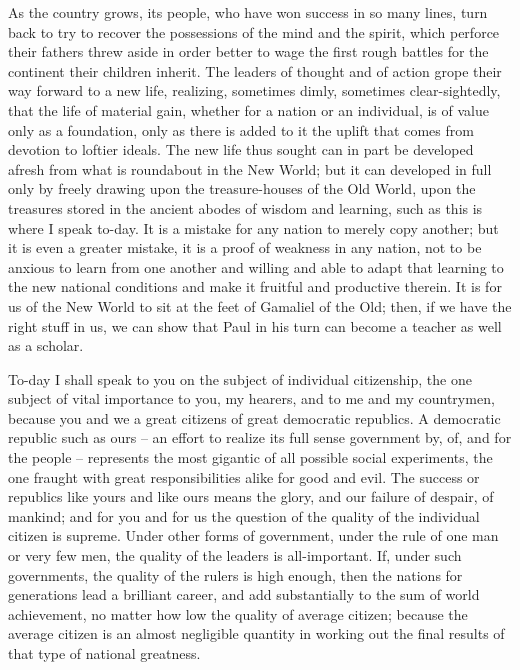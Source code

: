 \documentclass[a4paper]{amsbook}
\begin{document}
As the country grows, its people, who have won success in so many lines, turn back to try to recover the possessions of the mind and the spirit, which perforce their fathers threw aside in order better to wage the first rough battles for the continent their children inherit. The leaders of thought and of action grope their way forward to a new life, realizing, sometimes dimly, sometimes clear-sightedly, that the life of material gain, whether for a nation or an individual, is of value only as a foundation, only as there is added to it the uplift that comes from devotion to loftier ideals. The new life thus sought can in part be developed afresh from what is roundabout in the New World; but it can developed in full only by freely drawing upon the treasure-houses of the Old World, upon the treasures stored in the ancient abodes of wisdom and learning, such as this is where I speak to-day. It is a mistake for any nation to merely copy another; but it is even a greater mistake, it is a proof of weakness in any nation, not to be anxious to learn from one another and willing and able to adapt that learning to the new national conditions and make it fruitful and productive therein. It is for us of the New World to sit at the feet of Gamaliel of the Old; then, if we have the right stuff in us, we can show that Paul in his turn can become a teacher as well as a scholar.

To-day I shall speak to you on the subject of individual citizenship, the one subject of vital importance to you, my hearers, and to me and my countrymen, because you and we a great citizens of great democratic republics. A democratic republic such as ours – an effort to realize its full sense government by, of, and for the people – represents the most gigantic of all possible social experiments, the one fraught with great responsibilities alike for good and evil. The success or republics like yours and like ours means the glory, and our failure of despair, of mankind; and for you and for us the question of the quality of the individual citizen is supreme. Under other forms of government, under the rule of one man or very few men, the quality of the leaders is all-important. If, under such governments, the quality of the rulers is high enough, then the nations for generations lead a brilliant career, and add substantially to the sum of world achievement, no matter how low the quality of average citizen; because the average citizen is an almost negligible quantity in working out the final results of that type of national greatness.
\end{document}
